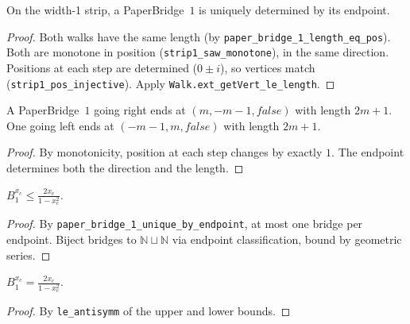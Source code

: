 \begin{lemma}
\begin{lemma}\label{lem:bridge_unique}
\leanok
{}
  On the width-1 strip, a PaperBridge~$1$ is uniquely determined by its endpoint.
\end{lemma}
\begin{proof}\leanok
  Both walks have the same length (by \texttt{paper\_bridge\_1\_length\_eq\_pos}).
  Both are monotone in position (\texttt{strip1\_saw\_monotone}), in the same direction.
  Positions at each step are determined ($0 \pm i$), so vertices match
  (\texttt{strip1\_pos\_injective}).
  Apply \texttt{Walk.ext\_getVert\_le\_length}.
\end{proof}

\begin{lemma}\label{lem:bridge_endpoint}
\leanok
{}
  A PaperBridge~$1$ going right ends at $(m, -m{-}1, \mathit{false})$ with length $2m{+}1$.
  One going left ends at $(-m{-}1, m, \mathit{false})$ with length $2m{+}1$.
\end{lemma}
\begin{proof}\leanok
  By monotonicity, position at each step changes by exactly $1$.
  The endpoint determines both the direction and the length.
\end{proof}

\begin{lemma}\label{lem:bridge_partition_le}
\leanok
{}
  $B_1^{x_c} \leq \frac{2x_c}{1 - x_c^2}$.
\end{lemma}
\begin{proof}\leanok
  By \texttt{paper\_bridge\_1\_unique\_by\_endpoint}, at most one bridge per endpoint.
  Biject bridges to $\mathbb{N} \sqcup \mathbb{N}$ via endpoint classification,
  bound by geometric series.
\end{proof}

\begin{theorem}[Exact bridge partition for $T = 1$]\label{thm:bridge_exact}
\leanok
{}
  $B_1^{x_c} = \frac{2x_c}{1 - x_c^2}$.
\end{theorem}
\begin{proof}\leanok By \texttt{le\_antisymm} of the upper and lower bounds.\end{proof}


\end{lemma}
